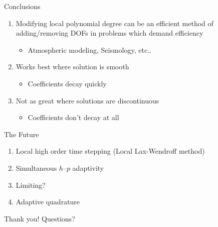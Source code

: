 \documentclass[sansserif]{beamer}
\begin{document}
\begin{frame}{Conclusions}
\begin{enumerate}
\item<1-> Modifying local polynomial degree can be an efficient method of adding/removing DOFs in problems which demand efficiency
	\begin{itemize}
	\item<1-> Atmospheric modeling, Seismology, etc..
	\end{itemize}
\item<2-> Works best where solution is smooth
	\begin{itemize}
	\item<2-> Coefficients decay quickly
	\end{itemize}
\item<3-> Not as great where solutions are discontinuous
	\begin{itemize}
	\item<3-> Coefficients don't decay at all
	\end{itemize}
\end{enumerate}
\end{frame}

\begin{frame}{The Future}
\begin{enumerate}
\item Local high order time stepping (Local Lax-Wendroff method)
\item Simultaneous $h$--$p$ adaptivity
\item Limiting?
\item Adaptive quadrature
\end{enumerate}
\end{frame}

\begin{frame}{Thank you!}
Questions?
\end{frame}
\end{document}
